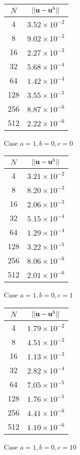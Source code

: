 \begin{subfigure}[b]{0.30\textwidth}
\centering
\begin{tabular}{| c | c |} \hline
    $N$ & $||\mathbf{u} - \mathbf{u}^h||$ \\ \hline
    4 & $3.52\times10^{-2}$ \\
    8 & $9.02\times10^{-3}$ \\
    16 & $2.27\times10^{-3}$ \\
    32 & $5.68\times10^{-4}$ \\
    64 & $1.42\times10^{-4}$ \\
    128 & $3.55\times10^{-5}$ \\
    256 & $8.87\times10^{-6}$ \\
    512 & $2.22\times10^{-6}$ \\ \hline
\end{tabular}
\caption{Case $a = 1, b = 0, c = 0$}
\end{subfigure}
\begin{subfigure}[b]{0.30\textwidth}
\centering
\begin{tabular}{| c | c |} \hline
    $N$ & $|| \mathbf{u} - \mathbf{u}^h||$ \\ \hline
    4 & $3.21\times10^{-2}$ \\
    8 & $8.20\times10^{-3}$ \\
    16 & $2.06\times10^{-3}$ \\
    32 & $5.15\times10^{-4}$ \\
    64 & $1.29\times10^{-4}$ \\
    128 & $3.22\times10^{-5}$ \\
    256 & $8.06\times10^{-6}$ \\
    512 & $2.01\times10^{-6}$ \\ \hline
\end{tabular}
\caption{Case $a = 1, b = 0, c = 1$}
\end{subfigure}
\begin{subfigure}[b]{0.30\textwidth}
\centering
\begin{tabular}{| c | c |} \hline
    $N$ & $|| \mathbf{u} - \mathbf{u}^h||$ \\ \hline
    4 & $1.79\times10^{-2}$ \\
    8 & $4.51\times10^{-3}$ \\
    16 & $1.13\times10^{-3}$ \\
    32 & $2.82\times10^{-4}$ \\
    64 & $7.05\times10^{-5}$ \\
    128 & $1.76\times10^{-5}$ \\
    256 & $4.41\times10^{-6}$ \\
    512 & $1.10\times10^{-6}$ \\ \hline
\end{tabular}
\caption{Case $a = 1, b = 0, c = 10$}
\end{subfigure}

